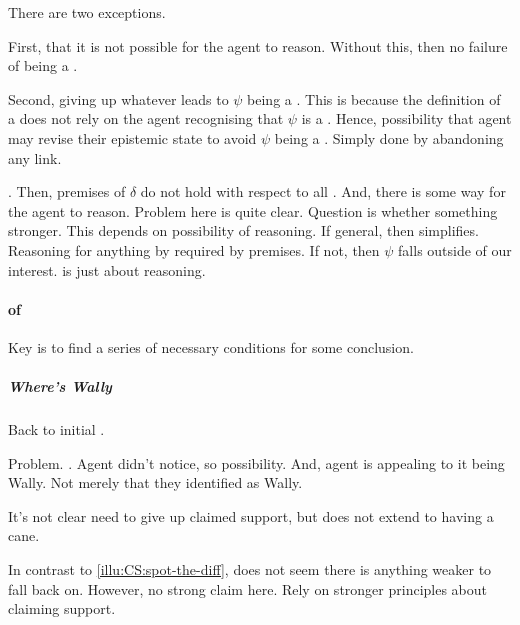 \begin{note}
  There are two exceptions.

  First, that it is not possible for the agent to reason.
  Without this, then no failure of being a \sink{}.

  Second, giving up whatever leads to \(\psi\) being a \prequ{}.
  This is because the definition of a \prequ{} does not rely on the agent recognising that \(\psi\) is a \prequ{}.
  Hence, possibility that agent may revise their epistemic state to avoid \(\psi\) being a \prequ{}.
  Simply done by abandoning any link.
\end{note}

\begin{note}[\prequ{}]
  \prequ{}.
  Then, premises of \(\delta\) do not hold with respect to all .
  And, there is some way for the agent to reason.
  Problem here is quite clear.
  Question is whether something stronger.
  This depends on possibility of reasoning.
  If general, then simplifies.
  Reasoning for anything by required by premises.
  If not, then \(\psi\) falls outside of our interest.
   is just about reasoning.
\end{note}



\paragraph{ of }

\begin{note}
  Key is to find a series of necessary conditions for some conclusion.
\end{note}

\subparagraph{Where's Wally}

\begin{note}
  Back to initial .
\end{note}

\begin{note}
  Problem.
  \requ{}.
  Agent didn't notice, so possibility.
  And, agent is appealing to it being Wally.
  Not merely that they identified as Wally.

  It's not clear need to give up claimed support, but does not extend to having a cane.

  In contrast to \ref{illu:CS:spot-the-diff}, does not seem there is anything weaker to fall back on.
  However, no strong claim here.
  Rely on stronger principles about claiming support.
\end{note}

